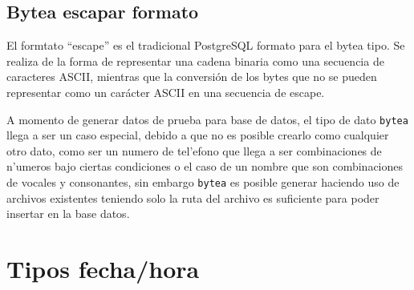 \subsection{Bytea escapar formato}
El formtato ``escape'' es el tradicional PostgreSQL formato para el bytea tipo. Se realiza de la forma de representar una cadena binaria como una secuencia de caracteres ASCII, mientras que la conversi\'on de los bytes que no se pueden representar como un car\'acter ASCII en una secuencia de escape.

A momento de generar datos de prueba para base de datos, el tipo de dato \texttt{bytea} llega a ser un caso especial, debido a que no es posible crearlo como cualquier otro dato, como ser un numero de tel'efono que llega a ser combinaciones de n'umeros bajo ciertas condiciones o el caso de un nombre que son combinaciones de vocales y consonantes, sin embargo \texttt{bytea} es posible generar haciendo uso de archivos existentes teniendo solo la ruta del archivo es suficiente para poder insertar en la base datos.
\section{Tipos fecha/hora}
